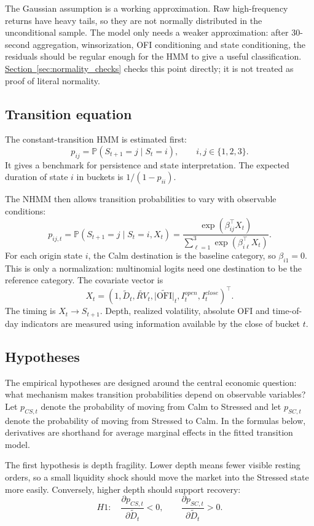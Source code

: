 \documentclass[12pt,a4paper]{article}
\newcommand{\OFI}{\mathrm{OFI}}
\newcommand{\Prob}{\mathbb{P}}
\newcommand{\secref}[1]{\hyperref[#1]{Section~\ref*{#1}}}
\begin{document}
The Gaussian assumption is a working approximation. Raw high-frequency returns have heavy tails, so they are not normally distributed in the unconditional sample. The model only needs a weaker approximation: after 30-second aggregation, winsorization, OFI conditioning  and state conditioning, the residuals should be regular enough for the HMM to give a useful classification. \secref{sec:normality_checks} checks this point directly; it is not treated as proof of literal normality.

\subsection{Transition equation}\label{sec:transition_model}

The constant-transition HMM is estimated first:
\[
p_{ij}=\Prob(S_{t+1}=j\mid S_t=i), \qquad i,j\in\{1,2,3\}.
\]
It gives a benchmark for persistence and state interpretation. The expected duration of state \(i\) in buckets is \(1/(1-p_{ii})\).

The NHMM then allows transition probabilities to vary with observable conditions:
\[
p_{ij,t}=\Prob(S_{t+1}=j\mid S_t=i,X_t)
=
\frac{\exp(\beta_{ij}^{\top}X_t)}
{\sum_{\ell=1}^{3}\exp(\beta_{i\ell}^{\top}X_t)}.
\]
For each origin state \(i\), the Calm destination is the baseline category, so \(\beta_{i1}=0\). This is only a normalization: multinomial logits need one destination to be the reference category. The covariate vector is
\[
X_t=(1,\tilde{D}_t,\widetilde{RV}_t,\widetilde{|\OFI|}_t,I^{open}_t,I^{close}_t)^\top .
\]
The timing is \(X_t\to S_{t+1}\). Depth, realized volatility, absolute OFI  and time-of-day indicators are measured using information available by the close of bucket \(t\).

\subsection{Hypotheses}\label{sec:hypotheses}

The empirical hypotheses are designed around the central economic question: what mechanism makes transition probabilities depend on observable variables? Let \(p_{CS,t}\) denote the probability of moving from Calm to Stressed  and let \(p_{SC,t}\) denote the probability of moving from Stressed to Calm. In the formulas below, derivatives are shorthand for average marginal effects in the fitted transition model.

The first hypothesis is depth fragility. Lower depth means fewer visible resting orders, so a small liquidity shock should move the market into the Stressed state more easily. Conversely, higher depth should support recovery:
\[
H1:\quad
\frac{\partial p_{CS,t}}{\partial \tilde{D}_t}<0,
\qquad
\frac{\partial p_{SC,t}}{\partial \tilde{D}_t}>0.
\]
\end{document}

